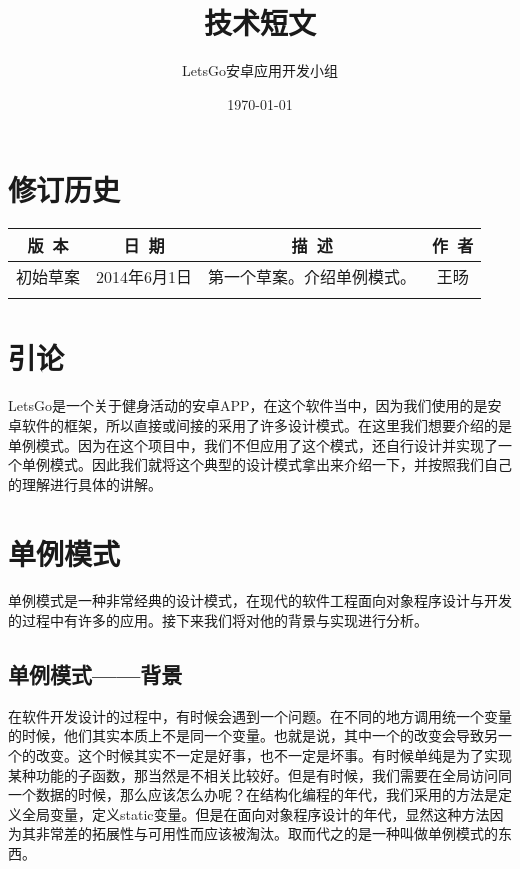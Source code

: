 \documentclass [a4paper,11pt]{article}
\title{技术短文}
\date{\today}
\author{LetsGo安卓应用开发小组}
\begin{document}
	
\maketitle
\section*{修订历史}

\begin{table}[!hbp]
\centering

\begin{tabular*}{\textwidth}{c|c|c|c}
\hline
\rule{0pt}{0.8cm}
版~本 & 日~期 & 描~述 & 作~者\\
\hline
\rule{0pt}{0.6cm}
初始草案 & 2014年6月1日 & 第一个草案。介绍单例模式。 & 王旸\\
\hline
\rule{0pt}{0.6cm}
 &  &  & \\
\hline
\end{tabular*}

\end{table}

\section{引论}
LetsGo是一个关于健身活动的安卓APP，在这个软件当中，因为我们使用的是安卓软件的框架，所以直接或间接的采用了许多设计模式。在这里我们想要介绍的是单例模式。因为在这个项目中，我们不但应用了这个模式，还自行设计并实现了一个单例模式。因此我们就将这个典型的设计模式拿出来介绍一下，并按照我们自己的理解进行具体的讲解。

\section{单例模式}
单例模式是一种非常经典的设计模式，在现代的软件工程面向对象程序设计与开发的过程中有许多的应用。接下来我们将对他的背景与实现进行分析。
\subsection{单例模式——背景}
在软件开发设计的过程中，有时候会遇到一个问题。在不同的地方调用统一个变量的时候，他们其实本质上不是同一个变量。也就是说，其中一个的改变会导致另一个的改变。这个时候其实不一定是好事，也不一定是坏事。有时候单纯是为了实现某种功能的子函数，那当然是不相关比较好。但是有时候，我们需要在全局访问同一个数据的时候，那么应该怎么办呢？在结构化编程的年代，我们采用的方法是定义全局变量，定义static变量。但是在面向对象程序设计的年代，显然这种方法因为其非常差的拓展性与可用性而应该被淘汰。取而代之的是一种叫做单例模式的东西。
\end{document}
